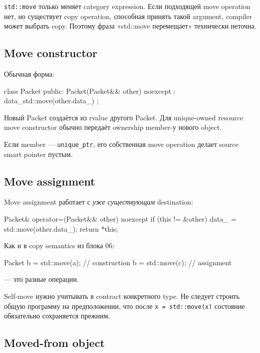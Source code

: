 \begin{whybox}
\texttt{std::move} только меняет category expression. Если подходящей move
operation нет, но существует copy operation, способная принять такой argument,
compiler может выбрать copy. Поэтому фраза «std::move перемещает» технически
неточна.
\end{whybox}

\subsection{Move constructor}

Обычная форма:

\begin{cppcode}
class Packet {
public:
    Packet(Packet&& other) noexcept
        : data_{std::move(other.data_)} {}
};
\end{cppcode}

Новый Packet создаётся из rvalue другого Packet. Для unique-owned resource
move constructor обычно передаёт ownership member-у нового object.

Если member --- \texttt{unique\_ptr}, его собственная move operation делает
source smart pointer пустым.

\subsection{Move assignment}

Move assignment работает с \emph{уже существующим} destination:

\begin{cppcode}
Packet& operator=(Packet&& other) noexcept {
    if (this != &other) {
        data_ = std::move(other.data_);
    }
    return *this;
}
\end{cppcode}

Как и в copy semantics из блока 06:

\begin{cppcode}
Packet b = std::move(a); // construction
b = std::move(c);        // assignment
\end{cppcode}

--- это разные операции.

Self-move нужно учитывать в contract конкретного type. Не следует строить
общую программу на предположении, что после \texttt{x = std::move(x)} состояние
обязательно сохраняется прежним.

\subsection{Moved-from object}

